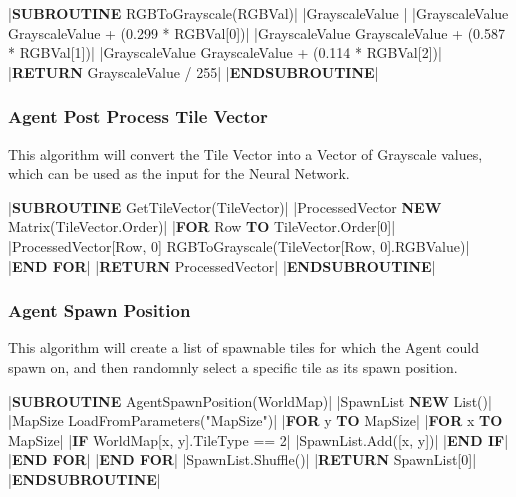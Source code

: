 \begin{flushleft}
                \vspace{0.2cm}
                \begin{pseudocode}
|\textbf{SUBROUTINE} RGBToGrayscale(RGBVal)|
    |GrayscaleValue |
    |GrayscaleValue \leftarrow GrayscaleValue + (0.299 * RGBVal[0])|
    |GrayscaleValue \leftarrow GrayscaleValue + (0.587 * RGBVal[1])|
    |GrayscaleValue \leftarrow GrayscaleValue + (0.114 * RGBVal[2])|
    |\textbf{RETURN} GrayscaleValue / 255|
|\textbf{ENDSUBROUTINE}|
                \end{pseudocode}

                \vspace{0.5cm}
            \subsubsection{Agent Post Process Tile Vector}
                This algorithm will convert the Tile Vector into a Vector of Grayscale values, which can be used as the input for the Neural
                Network.

                \vspace{0.2cm}
                \begin{pseudocode}
|\textbf{SUBROUTINE} GetTileVector(TileVector)|
    |ProcessedVector \leftarrow \textbf{NEW} Matrix(TileVector.Order)|
    |\textbf{FOR} Row  \textbf{TO} TileVector.Order[0]|
        |ProcessedVector[Row, 0] \leftarrow RGBToGrayscale(TileVector[Row, 0].RGBValue)|
    |\textbf{END FOR}|
    |\textbf{RETURN} ProcessedVector|
|\textbf{ENDSUBROUTINE}|
                \end{pseudocode}
                
                \vspace{0.5cm}
            \subsubsection{Agent Spawn Position}
                This algorithm will create a list of spawnable tiles for which the Agent could spawn on, and then randomnly select a specific
                tile as its spawn position.

                \vspace{0.2cm}
                \begin{pseudocode}
|\textbf{SUBROUTINE} AgentSpawnPosition(WorldMap)|
    |SpawnList \leftarrow \textbf{NEW} List()|
    |MapSize \leftarrow LoadFromParameters("MapSize")|
    |\textbf{FOR} y  \textbf{TO} MapSize|
        |\textbf{FOR} x  \textbf{TO} MapSize|
            |\textbf{IF} WorldMap[x, y].TileType == 2|
                |SpawnList.Add([x, y])|
            |\textbf{END IF}|
        |\textbf{END FOR}|
    |\textbf{END FOR}|
    |SpawnList.Shuffle()|
    |\textbf{RETURN} SpawnList[0]|
|\textbf{ENDSUBROUTINE}|
                \end{pseudocode}


\end{flushleft}
